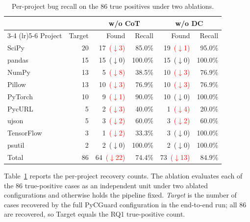 \begin{table}[t]
\caption{Per-project bug recall on the 86 true positives under two ablations.}
\label{tab:llm-ablation}
\centering
\small
\setlength{\tabcolsep}{4pt}
\begin{tabular}{lr rr rr}
\toprule
& & \multicolumn{2}{c}{w/o CoT} & \multicolumn{2}{c}{w/o DC} \\
\cmidrule(lr){3-4} \cmidrule(lr){5-6}
Project    & Target & Found & Recall & Found & Recall \\
\midrule
SciPy      & 20 & 17~{\scriptsize\textcolor{red}{($\downarrow$3)}} & 85.0\% & 19~{\scriptsize\textcolor{red}{($\downarrow$1)}} & 95.0\% \\
pandas     & 15 & 15~{\scriptsize\textcolor{green!60!black}{($\downarrow$0)}} & 100.0\% & 15~{\scriptsize\textcolor{green!60!black}{($\downarrow$0)}} & 100.0\% \\
NumPy      & 13 &  5~{\scriptsize\textcolor{red}{($\downarrow$8)}} & 38.5\% & 10~{\scriptsize\textcolor{red}{($\downarrow$3)}} & 76.9\% \\
Pillow     & 13 & 10~{\scriptsize\textcolor{red}{($\downarrow$3)}} & 76.9\% & 10~{\scriptsize\textcolor{red}{($\downarrow$3)}} & 76.9\% \\
PyTorch    & 10 &  9~{\scriptsize\textcolor{red}{($\downarrow$1)}} & 90.0\% & 10~{\scriptsize\textcolor{green!60!black}{($\downarrow$0)}} & 100.0\% \\
PycURL     &  5 &  2~{\scriptsize\textcolor{red}{($\downarrow$3)}} & 40.0\% &  1~{\scriptsize\textcolor{red}{($\downarrow$4)}} & 20.0\% \\
ujson      &  5 &  3~{\scriptsize\textcolor{red}{($\downarrow$2)}} & 60.0\% &  3~{\scriptsize\textcolor{red}{($\downarrow$2)}} & 60.0\% \\
TensorFlow &  3 &  1~{\scriptsize\textcolor{red}{($\downarrow$2)}} & 33.3\% &  3~{\scriptsize\textcolor{green!60!black}{($\downarrow$0)}} & 100.0\% \\
psutil     &  2 &  2~{\scriptsize\textcolor{green!60!black}{($\downarrow$0)}} & 100.0\% &  2~{\scriptsize\textcolor{green!60!black}{($\downarrow$0)}} & 100.0\% \\
\midrule
Total      & 86 & 64~{\scriptsize\textcolor{red}{($\downarrow$22)}} & 74.4\% & 73~{\scriptsize\textcolor{red}{($\downarrow$13)}} & 84.9\% \\
\bottomrule
\end{tabular}
\end{table}

Table~\ref{tab:llm-ablation} reports the per-project recovery counts.
The ablation evaluates each of the 86 true-positive cases as an
independent unit under two ablated configurations and otherwise holds
the pipeline fixed. \emph{Target} is the number of cases recovered by
the full PyCGuard configuration in the end-to-end run; all 86 are
recovered, so Target equals the RQ1 true-positive count.

